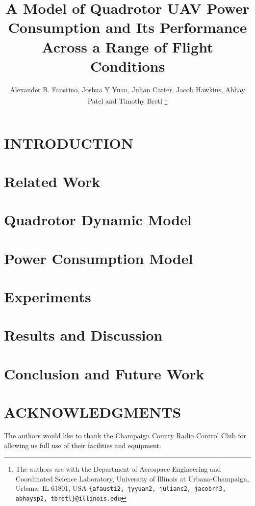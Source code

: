 \documentclass[letterpaper, 10 pt, conference]{ieeeconf}  %
\title{\LARGE \bf
A Model of Quadrotor UAV Power Consumption and Its Performance Across a Range of Flight Conditions
}
\author{Alexander B. Faustino, Joshua Y Yuan, Julian Carter, Jacob Hawkins, Abhay Patel and Timothy Bretl%
	\thanks{The authors are with the Department of Aerospace Engineering and Coordinated Science Laboratory, 
		University of Illinois at Urbana-Champaign, Urbana, IL 61801, USA
		\tt\small \{afausti2, jyyuan2, julianc2, jacobrh3, abhaysp2, tbretl\}@illinois.edu}%
}
\begin{document}
\maketitle
\thispagestyle{empty}
\pagestyle{empty}





\section{INTRODUCTION}
\label{sec:Intro}


\section{Related Work}
\label{sec:Related}


\section{Quadrotor Dynamic Model}
\label{sec:Dynamics}


\section{Power Consumption Model}
\label{sec:Power}


\section{Experiments}
\label{sec:Exp}


\section{Results and Discussion}
\label{sec:Results}


\section{Conclusion and Future Work}
\label{sec:Future}





\section*{ACKNOWLEDGMENTS}

The authors would like to thank the Champaign County Radio Control Club for allowing us full use of their facilities and equipment. 



\end{document}
